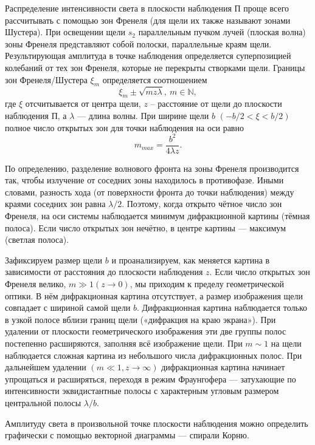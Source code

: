 \documentclass[12pt]{article}
\begin{document}
    Распределение интенсивности света в плоскости наблюдения П проще всего рассчитывать с помощью зон Френеля
    (для щели их также называют зонами Шустера).
    При освещении щели $s_2$ параллельным пучком лучей (плоская волна) зоны Френеля представляют собой полоски,
    параллельные краям щели.
    Результирующая амплитуда в точке наблюдения определяется суперпозицией колебаний от тех зон Френеля,
    которые не перекрыты створками щели.
    Границы зон Френеля/Шустера $\xi_m$ определяется соотношением
    \begin{equation}
        \xi_m \pm \sqrt{mz\lambda},\ m\in \mathbb{N},
        \label{eq:1}
    \end{equation}
    где $\xi$ отсчитывается от центра щели, $z$ -- расстояние от щели до плоскости наблюдения П,
    а $\lambda$ — длина волны.
    При ширине щели $b$ $(-b/2 < \xi < b/2)$ полное число открытых зон для
    точки наблюдения на оси равно
    \[
        m_{max} = \frac{b^2}{4\lambda z}.
    \]

    По определению, разделение волнового фронта на зоны Френеля
    производится так, чтобы излучение от соседних зоны находилось в противофазе.
    Иными словами, разность хода (от поверхности фронта до точки наблюдения) между краями соседних зон равна $\lambda/2$.
    Поэтому, когда открыто чётное число зон Френеля, на оси системы наблюдается минимум дифракционной картины (тёмная полоса).
    Если число открытых зон нечётно, в центре картины — максимум (светлая полоса).

    Зафиксируем размер щели $b$ и проанализируем, как меняется картина в зависимости от расстояния до плоскости наблюдения $z$.
    Если число открытых зон Френеля велико, $m \gg 1 (z \rightarrow 0)$, мы приходим к пределу геометрической оптики.
    В нём дифракционная картина отсутствует, а размер изображения щели совпадает с шириной самой щели $b$.
    Дифракционная картина наблюдается только в узкой полосе вблизи границ щели («дифракция на краю экрана»).
    При удалении от плоскости геометрического изображения эти две группы полос
    постепенно расширяются, заполняя всё изображение щели.
    При $m \sim 1$ на щели наблюдается сложная картина из небольшого числа дифракционных полос.
    При дальнейшем удалении $(m \ll 1, z \rightarrow \infty)$ дифракционная картина начинает упрощаться и расширяться,
    переходя в режим Фраунгофера — затухающие по интенсивности эквидистантные полосы
    с характерным угловым размером центральной полосы $\lambda/b$.

    Амплитуду света в произвольной точке плоскости наблюдения можно определить графически с помощью векторной диаграммы — спирали Корню.
\end{document}
